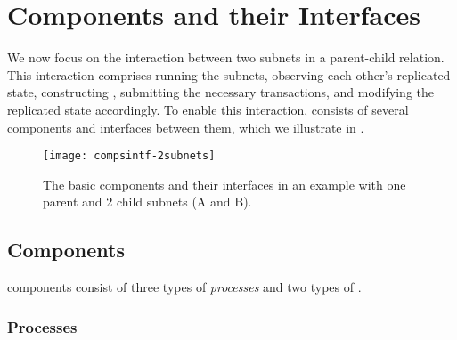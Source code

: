  \section{Components and their Interfaces}
 \label{sec:components}

We now focus on the interaction between two subnets in a parent-child relation.
This interaction comprises running the subnets, observing each other's replicated state,
constructing \pofsFull, submitting the necessary transactions, and modifying the replicated state accordingly. To enable this interaction, \ipc consists of 
several components and interfaces between them, which we  
illustrate in .

\begin{figure}[ht]
     \centering
     \texttt{[image: compsintf-2subnets]}
     \caption{The basic \ipc components and their interfaces in an example with one parent and 2 child subnets (A and B).}
     \label{fig:interfaces}
 \end{figure}


\subsection{Components}

\ipc components consist of three types  of \emph{processes} and two types of \actors.

\subsubsection{Processes}

